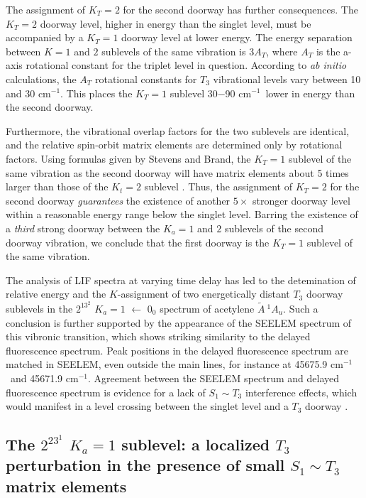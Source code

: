 \documentclass[12pt]{mitthesis}
\newcommand{\rcm}{cm$^{-1}$}
\newcommand{\astate}{$
  \tilde{A} \: ^1\!A_u
  $}
\newcommand{\Ka}[1]{$K_a\!\!=\!#1$}
\begin{document}
The assignment of $K_T=2$ for the second doorway has further
consequences.  The $K_T=2$ doorway level, higher in energy than the
singlet level, must be accompanied by a $K_T=1$ doorway level at lower
energy.  The energy separation between $K=1$ and $2$ sublevels of the
same vibration is $3A_T$, where $A_T$ is the a-axis rotational
constant for the triplet level in question.  According to \emph{ab
  initio} calculations, the $A_T$ rotational constants for $T_3$
vibrational levels vary between 10 and 30 \rcm \cite{thom07}.  This
places the $K_T=1$ sublevel 30$-$90 \rcm\ lower in energy than the
second doorway.

Furthermore, the vibrational overlap factors for the two sublevels are
identical, and the relative spin-orbit matrix elements are determined
only by rotational factors.  Using formulas given by Stevens and
Brand, the $K_T=1$ sublevel of the same vibration as the second
doorway will have matrix elements about 5 times larger than those of
the $K_t=2$ sublevel \cite{stevens73}.  Thus, the assignment of
$K_T=2$ for the second doorway \emph{guarantees} the existence of
another $5 \times$ stronger doorway level within a reasonable energy
range below the singlet level.  Barring the existence of a
\emph{third} strong doorway between the $K_a=1$ and $2$ sublevels of
the second doorway vibration, we conclude that the first doorway is
the $K_T=1$ sublevel of the same vibration.

The analysis of LIF spectra at varying time delay has led to the
detemination of relative energy and the $K$-assignment of two
energetically distant $T_3$ doorway sublevels in the $2^13^2$ \Ka{1}
$\leftarrow$ $0_0$ spectrum of acetylene \astate.  Such a conclusion
is further supported by the appearance of the SEELEM spectrum of this
vibronic transition, which shows striking similarity to the delayed
fluorescence spectrum.  Peak positions in the delayed fluorescence
spectrum are matched in SEELEM, even outside the main lines, for
instance at 45675.9 \rcm\ and 45671.9 \rcm.  Agreement between the
SEELEM spectrum and delayed fluorescence spectrum is evidence for a
lack of $S_1 \sim T_3$ interference effects, which would manifest in a
level crossing between the singlet level and a $T_3$ doorway
\cite{altunata01}.


\subsection{The $2^23^1$ \Ka{1} sublevel: a localized $T_3$
  perturbation in the presence of small $S_1 \sim T_3$ matrix
  elements}
\end{document}
